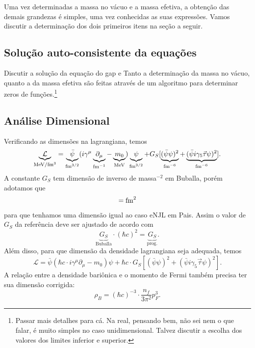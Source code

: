 %
Uma vez determinadas a massa no vácuo e a massa efetiva, a obtenção das demais grandezas é simples, uma vez conhecidas as suas expressões. Vamos discutir a determinação dos dois primeiros itens na seção a seguir. 

\subsection{Solução auto-consistente da equações}

Discutir a solução da equação do gap e 
Tanto a determinação da massa no vácuo, quanto a da massa efetiva são feitas através de um algoritmo para determinar zeros de funções.\footnote{Passar mais detalhes para cá. Na real, pensando bem, não sei nem o que falar, é muito simples no caso unidimensional. Talvez discutir a escolha dos valores dos limites inferior e superior.}

\subsection{Análise Dimensional}

Verificando as dimensões na lagrangiana, temos
\begin{equation}
	\underbrace{\mathcal{L}}_{\mathcal{\rm{MeV}/\rm{fm}^3}} = \underbrace{\bar{\psi}}_{\rm{fm}^{3/2}}(i\gamma^\mu\underbrace{\partial_\mu}_{\rm{fm}^{-1}} - \underbrace{m_0}_{\rm{MeV}})\underbrace{\psi}_{\rm{fm}^{3/2}} + G_S [ \underbrace{(\bar{\psi}\psi)^2}_{\rm{fm}^{-6}} + \underbrace{(\bar{\psi}i\gamma_5\vec{\tau}\psi)^2}_{\rm{fm}^{-6}}].
\end{equation}
%
A constante $G_S$ tem dimensão de inverso de massa$^{-2}$ em Buballa\cite{Buballa1996}, porém adotamos que 
\begin{equation}
	[G_S] = \rm{fm}^{2}
\end{equation}
%
para que tenhamos uma dimensão igual ao caso eNJL em Pais\cite{Pais}. Assim o valor de $G_S$ da referência deve ser ajustado de acordo com
\begin{equation}
	\underbrace{G_S}_{\textrm{Buballa}} \cdot (\hbar c)^2 = \underbrace{G_S}_{\textrm{prog.}}.
\end{equation}
%
Além disso, para que dimensão da densidade lagrangiana seja adequada, temos
\begin{equation}
	\mathcal{L} = \bar{\psi}(\hbar c \cdot i\gamma^\mu\partial_\mu - m_0)\psi + \hbar c \cdot G_S[(\bar{\psi}\psi)^2 + (\bar{\psi}i\gamma_5\vec{\tau}\psi)^2].
\end{equation}
%
A relação entre a densidade bariônica e o momento de Fermi também precisa ter sua dimensão corrigida:
\begin{equation}
	\rho_B = (\hbar c)^{-3} \cdot \frac{n_f}{3\pi^2}p_F^3.
\end{equation}

